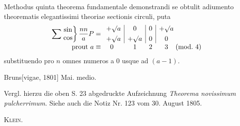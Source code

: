 \noindent\hspace*{\parindent}Methodus quinta theorema fundamentale demonstrandi se obtulit adiumento theorematis elegantissimi theoriae sectionis circuli, puta
\clearpage{}
\[
\begin{array}{r@{\;}cccc@{\;}l}
\displaystyle\sum\left.\begin{matrix}\sin\\\cos\end{matrix}\right\}\frac{nn}{a}P=
&\multicolumn{1}{c|}{\begin{gathered}+\surd a\\+\surd a\end{gathered}}
&\multicolumn{1}{c|}{\begin{gathered}0\\+\surd a\end{gathered}}
&\multicolumn{1}{c|}{\begin{gathered}0\\0\end{gathered}}
&\begin{gathered}+\surd a\\0\end{gathered}&\\[5pt]
\text{prout }a\equiv&0&1&2&3&(\mathrm{mod.}\ 4)
\end{array}
\]
\noindent substituendo pro \(n\) omnes numeros a 0 usque ad \((a-1)\).
\par\noindent\hfill Bruns[vigae, 1801] Mai. medio.
\par\medskip\begingroup\small
\noindent\hspace*{\parindent}Vergl. hierzu die oben S. 23 abgedruckte Aufzeichnung \textit{Theorema novissimum pulcherrimum}. Siehe auch die Notiz Nr. 123 vom 30. August 1805.
\par\noindent\hfill\textsc{Klein.}
\par\endgroup
